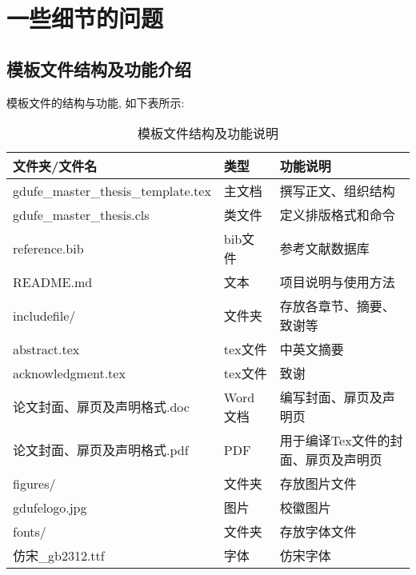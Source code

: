 \chapter{一些细节的问题}

\section{模板文件结构及功能介绍}

模板文件的结构与功能, 如下表所示:
\begin{table}[ht]\centering
  \begin{tabular}{lll}
    \toprule
    文件夹/文件名                             & 类型     & 功能说明                \\
    \midrule
    gdufe\_master\_thesis\_template.tex & 主文档    & 撰写正文、组织结构           \\
    gdufe\_master\_thesis.cls           & 类文件    & 定义排版格式和命令           \\
    reference.bib                       & bib文件  & 参考文献数据库             \\
    README.md                           & 文本     & 项目说明与使用方法           \\
    includefile/                        & 文件夹    & 存放各章节、摘要、致谢等        \\
    \quad abstract.tex                  & tex文件  & 中英文摘要               \\
    \quad acknowledgment.tex            & tex文件  & 致谢                  \\
    \quad 论文封面、扉页及声明格式.doc              & Word文档 & 编写封面、扉页及声明页         \\
    \quad 论文封面、扉页及声明格式.pdf              & PDF    & 用于编译Tex文件的封面、扉页及声明页 \\
    figures/                            & 文件夹    & 存放图片文件              \\
    \quad gdufelogo.jpg                 & 图片     & 校徽图片                \\
    fonts/                              & 文件夹    & 存放字体文件              \\
    \quad 仿宋\_gb2312.ttf                & 字体     & 仿宋字体                \\
    \bottomrule
  \end{tabular}
  \caption{模板文件结构及功能说明}
\end{table}


